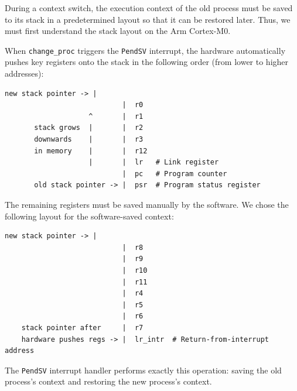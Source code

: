 During a context switch, the execution context of the old process must be saved to its
stack in a predetermined layout so that it can be restored later. Thus, we must first
understand the stack layout on the Arm Cortex-M0.

\begin{emptythm}
    When \lstinline[style=myagc]|change_proc| triggers the
    \lstinline[style=myagc]|PendSV| interrupt, the hardware automatically pushes key
    registers onto the stack in the following order (from lower to higher addresses):
\begin{lstlisting}[style=mytxt, caption={Hardware saved registers}, label={hard_context}]
       new stack pointer -> |                               
                            |  r0                          
                    ^       |  r1                          
       stack grows  |       |  r2                          
       downwards    |       |  r3                          
       in memory    |       |  r12                         
                    |       |  lr   # Link register       
                            |  pc   # Program counter     
       old stack pointer -> |  psr  # Program status register     
\end{lstlisting}

The remaining registers must be saved manually by the software. We chose the following
layout for the software-saved context:
\begin{lstlisting}[style=mytxt, caption={Software saved registers}, label={soft_context}]
       new stack pointer -> |                               
                            |  r8
                            |  r9
                            |  r10
                            |  r11
                            |  r4
                            |  r5
                            |  r6
    stack pointer after     |  r7
    hardware pushes regs -> |  lr_intr  # Return-from-interrupt address
\end{lstlisting}
\end{emptythm}

The \lstinline[style=myagc]|PendSV| interrupt handler performs exactly this operation:
saving the old process's context and restoring the new process's context.

